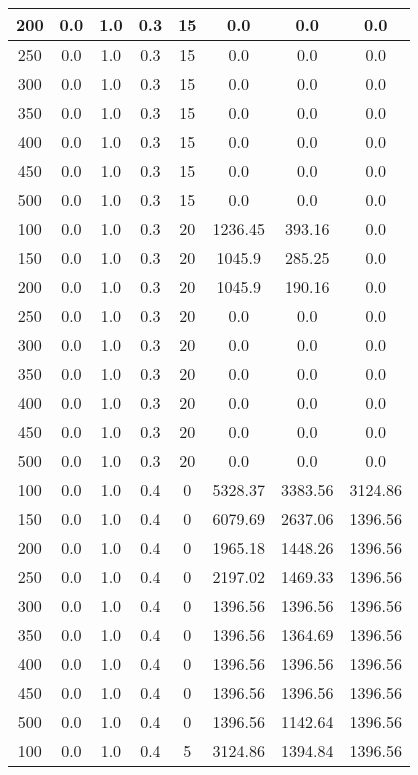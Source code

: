 \documentclass[a4paper, 12pt]{extreport}
\begin{document}
\begin{itemize}
\begin{longtable}{|c|c|c|c|c|c|c|c|}
			200 & 0.0 & 1.0 & 0.3 & 15 & 0.0 & 0.0 & 0.0 \\\hline
			250 & 0.0 & 1.0 & 0.3 & 15 & 0.0 & 0.0 & 0.0 \\\hline
			300 & 0.0 & 1.0 & 0.3 & 15 & 0.0 & 0.0 & 0.0 \\\hline
			350 & 0.0 & 1.0 & 0.3 & 15 & 0.0 & 0.0 & 0.0 \\\hline
			400 & 0.0 & 1.0 & 0.3 & 15 & 0.0 & 0.0 & 0.0 \\\hline
			450 & 0.0 & 1.0 & 0.3 & 15 & 0.0 & 0.0 & 0.0 \\\hline
			500 & 0.0 & 1.0 & 0.3 & 15 & 0.0 & 0.0 & 0.0 \\\hline
			100 & 0.0 & 1.0 & 0.3 & 20 & 1236.45 & 393.16 & 0.0 \\\hline
			150 & 0.0 & 1.0 & 0.3 & 20 & 1045.9 & 285.25 & 0.0 \\\hline
			200 & 0.0 & 1.0 & 0.3 & 20 & 1045.9 & 190.16 & 0.0 \\\hline
			250 & 0.0 & 1.0 & 0.3 & 20 & 0.0 & 0.0 & 0.0 \\\hline
			300 & 0.0 & 1.0 & 0.3 & 20 & 0.0 & 0.0 & 0.0 \\\hline
			350 & 0.0 & 1.0 & 0.3 & 20 & 0.0 & 0.0 & 0.0 \\\hline
			400 & 0.0 & 1.0 & 0.3 & 20 & 0.0 & 0.0 & 0.0 \\\hline
			450 & 0.0 & 1.0 & 0.3 & 20 & 0.0 & 0.0 & 0.0 \\\hline
			500 & 0.0 & 1.0 & 0.3 & 20 & 0.0 & 0.0 & 0.0 \\\hline
			100 & 0.0 & 1.0 & 0.4 & 0 & 5328.37 & 3383.56 & 3124.86 \\\hline
			150 & 0.0 & 1.0 & 0.4 & 0 & 6079.69 & 2637.06 & 1396.56 \\\hline
			200 & 0.0 & 1.0 & 0.4 & 0 & 1965.18 & 1448.26 & 1396.56 \\\hline
			250 & 0.0 & 1.0 & 0.4 & 0 & 2197.02 & 1469.33 & 1396.56 \\\hline
			300 & 0.0 & 1.0 & 0.4 & 0 & 1396.56 & 1396.56 & 1396.56 \\\hline
			350 & 0.0 & 1.0 & 0.4 & 0 & 1396.56 & 1364.69 & 1396.56 \\\hline
			400 & 0.0 & 1.0 & 0.4 & 0 & 1396.56 & 1396.56 & 1396.56 \\\hline
			450 & 0.0 & 1.0 & 0.4 & 0 & 1396.56 & 1396.56 & 1396.56 \\\hline
			500 & 0.0 & 1.0 & 0.4 & 0 & 1396.56 & 1142.64 & 1396.56 \\\hline
			100 & 0.0 & 1.0 & 0.4 & 5 & 3124.86 & 1394.84 & 1396.56 \\\hline

\end{longtable}
\end{itemize}
\end{document}
